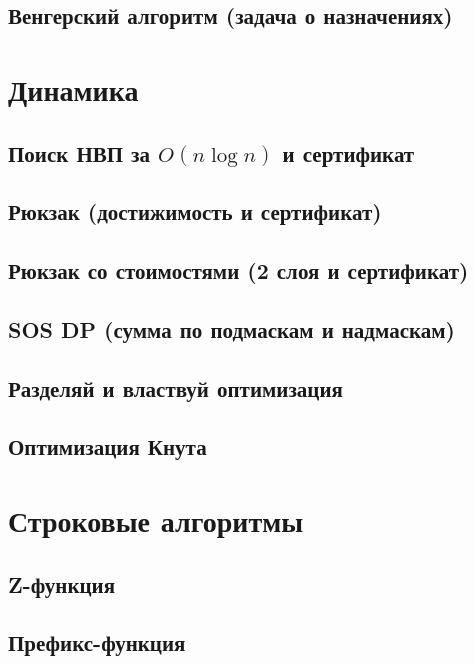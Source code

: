 \documentclass[a4paper,10pt,twocolumn,oneside]{article}
\begin{document}
\subsection{Венгерский алгоритм (задача о назначениях)}

\section{Динамика}
\subsection{Поиск НВП за $O(n\log{n})$ и сертификат}
\subsection{Рюкзак (достижимость и сертификат)}
\subsection{Рюкзак со стоимостями (2 слоя и сертификат)}
\subsection{SOS DP (сумма по подмаскам и надмаскам)}
\subsection{Разделяй и властвуй оптимизация}
\subsection{Оптимизация Кнута}

\section{Строковые алгоритмы}
\subsection{Z-функция}
\subsection{Префикс-функция}
\end{document}
